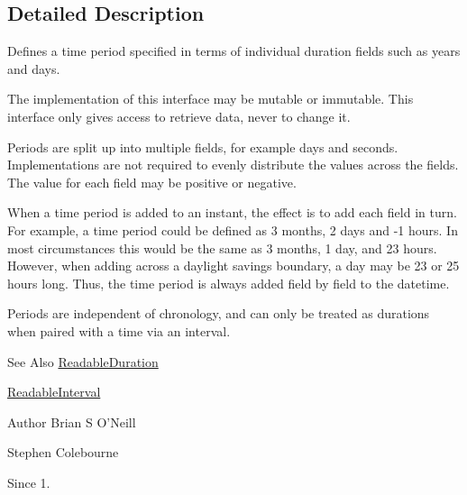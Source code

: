 \subsection{Detailed Description}
Defines a time period specified in terms of individual duration fields such as years and days. 

The implementation of this interface may be mutable or immutable. This interface only gives access to retrieve data, never to change it. 

Periods are split up into multiple fields, for example days and seconds. Implementations are not required to evenly distribute the values across the fields. The value for each field may be positive or negative. 

When a time period is added to an instant, the effect is to add each field in turn. For example, a time period could be defined as 3 months, 2 days and -\/1 hours. In most circumstances this would be the same as 3 months, 1 day, and 23 hours. However, when adding across a daylight savings boundary, a day may be 23 or 25 hours long. Thus, the time period is always added field by field to the datetime. 

Periods are independent of chronology, and can only be treated as durations when paired with a time via an interval.

\begin{DoxySeeAlso}{See Also}
\hyperlink{interfaceorg_1_1joda_1_1time_1_1_readable_duration}{Readable\-Duration} 

\hyperlink{interfaceorg_1_1joda_1_1time_1_1_readable_interval}{Readable\-Interval} 
\end{DoxySeeAlso}
\begin{DoxyAuthor}{Author}
Brian S O'Neill 

Stephen Colebourne 
\end{DoxyAuthor}
\begin{DoxySince}{Since}
1. 
\end{DoxySince}


